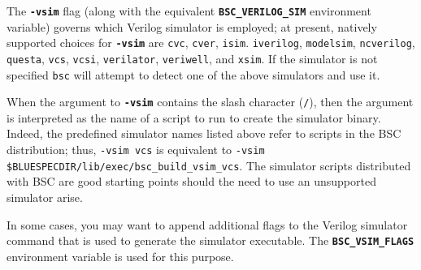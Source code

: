 \documentclass{article}
\newcommand{\te}[1]{\texttt{#1}}
\begin{document}


\index{-vsim@\te{-vsim} (compiler flag)}

\label{sec:using-verilog}
The \textbf{\texttt{-vsim}} flag
(along with the equivalent
\textbf{\texttt{BSC\_VERILOG\_SIM}} environment variable) governs which Verilog
simulator is employed; at present, natively supported choices for
\textbf{\texttt{-vsim}} are
\texttt{cvc},
\texttt{cver},
\texttt{isim}.
\texttt{iverilog},
\texttt{modelsim},
\texttt{ncverilog},
\texttt{questa},
\texttt{vcs},
\texttt{vcsi},
\texttt{verilator},
\texttt{veriwell},
and \texttt{xsim}.
If the simulator is not specified \texttt{bsc} will attempt to detect one
of the above simulators and use it.

When the argument to \textbf{\texttt{-vsim}} contains the slash character
(\texttt{/}), then the argument is interpreted as the name of a script to run
to create the simulator binary.  Indeed, the predefined simulator names listed
above refer to scripts in the BSC distribution; thus,
\texttt{-vsim vcs} is equivalent to \texttt{-vsim
\$BLUESPECDIR/lib/exec/bsc\_build\_vsim\_vcs}.  The simulator scripts distributed
with BSC are good starting points should the need to use an unsupported
simulator arise.

In some cases, you may want to append additional flags to the
Verilog simulator command that is used to generate the simulator
executable. The \textbf{\texttt{BSC\_VSIM\_FLAGS}} environment
variable is used for this purpose.
\end{document}

